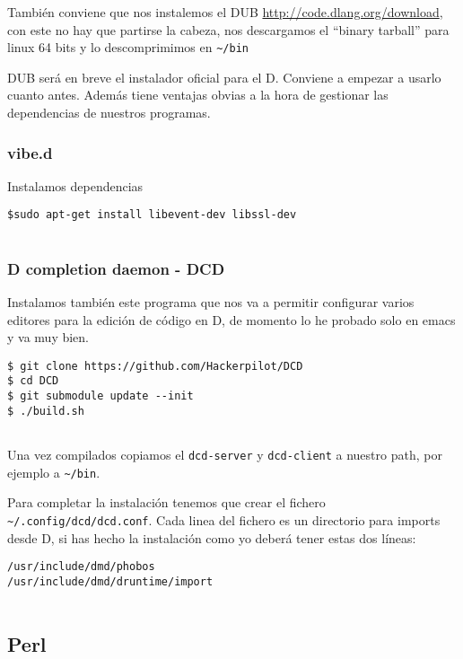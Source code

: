 También conviene que nos instalemos el DUB
\url{http://code.dlang.org/download}, con este no hay que partirse la
cabeza, nos descargamos el ``binary tarball'' para linux 64 bits y lo
descomprimimos en \texttt{\textasciitilde{}/bin}

DUB será en breve el instalador oficial para el D. Conviene a empezar a
usarlo cuanto antes. Además tiene ventajas obvias a la hora de gestionar
las dependencias de nuestros programas.

\subsubsection{vibe.d}\label{vibe.d}

Instalamos dependencias

\begin{verbatim}
$sudo apt-get install libevent-dev libssl-dev
        
\end{verbatim}

\subsubsection{D completion daemon -
DCD}\label{d-completion-daemon---dcd}

Instalamos también este programa que nos va a permitir configurar varios
editores para la edición de código en D, de momento lo he probado solo
en emacs y va muy bien.

\begin{verbatim}
$ git clone https://github.com/Hackerpilot/DCD
$ cd DCD
$ git submodule update --init
$ ./build.sh
        
\end{verbatim}

Una vez compilados copiamos el \texttt{dcd-server} y \texttt{dcd-client}
a nuestro path, por ejemplo a \texttt{\textasciitilde{}/bin}.

Para completar la instalación tenemos que crear el fichero
\texttt{\textasciitilde{}/.config/dcd/dcd.conf}. Cada linea del fichero
es un directorio para imports desde D, si has hecho la instalación como
yo deberá tener estas dos líneas:

\begin{verbatim}
/usr/include/dmd/phobos
/usr/include/dmd/druntime/import
        
\end{verbatim}

\subsection{Perl}\label{perl}

